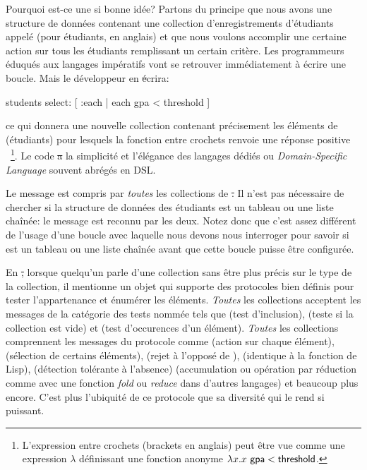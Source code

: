 \documentclass[a4paper,10pt,twoside]{book}
\begin{document}
Pourquoi est-ce une si bonne idée?
Partons du principe que nous avons une structure de données contenant
une collection d'enregistrements d'étudiants appelé 
(pour étudiants, en anglais) et que nous voulons
accomplir une certaine action sur tous les étudiants remplissant un
certain critère.
Les programmeurs éduqués aux langages impératifs vont se retrouver
immédiatement à écrire une boucle. Mais le développeur en \st écrira:
\begin{code}{}
students select: [ :each | each gpa < threshold ]
\end{code}
\noindent
ce qui donnera une nouvelle collection contenant précisement les
éléments de  (étudiants) pour lesquels la
fonction entre crochets renvoie une réponse positive \cad {}~\footnote{L'expression entre crochets (brackets en anglais) peut être vue comme une 
expression $\lambda$ définissant une fonction anonyme $\lambda x. x~{\sf gpa} < {\sf threshold}$.
}.
Le code \st a la simplicité et l'élégance des langages dédiés ou \emph{Domain-Specific Language} souvent abrégés en DSL. 

Le message  est compris par \emph{toutes} les collections de \st.
Il n'est pas nécessaire de chercher si la structure de données des étudiants est un tableau ou une liste chaînée: 
le message  est reconnu par les deux. 
Notez donc que c'est assez différent de l'usage d'une boucle avec laquelle
nous devons nous interroger pour savoir si  est un tableau
ou une liste chaînée avant que cette boucle puisse être configurée.

En \st, lorsque quelqu'un parle d'une collection sans être plus précis
sur le type de la collection, il mentionne un objet qui supporte des protocoles
bien définis pour tester l'appartenance et énumérer les éléments.
\emph{Toutes} les collections acceptent les messages 
de la catégorie des tests nommée  tels que \mbox{} (test d'inclusion),  (teste si la collection est vide) 
et \mbox{} (test d'occurences d'un élément). 
\emph{Toutes} les collections comprennent les messages du protocole 
 comme 
 (action sur chaque élément), 
 (sélection de certains éléments), 
 (rejet à l'opposé de ), 
 (identique à la fonction  de Lisp),
 (détection tolérante à l'absence) 
 (accumulation ou opération par réduction 
comme avec une fonction \emph{fold} ou \emph{reduce} dans d'autres langages) et
beaucoup plus encore.
C'est plus l'ubiquité de ce protocole que sa diversité qui le rend
si puissant.
\end{document}
